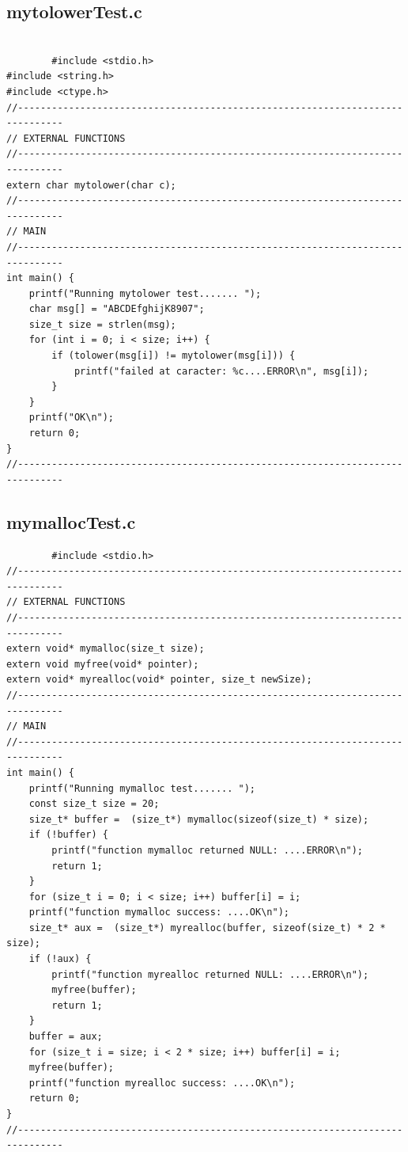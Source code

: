 \documentclass[a4paper,10pt]{article}
\begin{document}
    \subsection{mytolowerTest.c}
        \begin{lstlisting}
        
        #include <stdio.h>
#include <string.h>
#include <ctype.h>
//------------------------------------------------------------------------------
// EXTERNAL FUNCTIONS
//------------------------------------------------------------------------------
extern char mytolower(char c);
//------------------------------------------------------------------------------
// MAIN
//------------------------------------------------------------------------------
int main() {
    printf("Running mytolower test....... ");
    char msg[] = "ABCDEfghijK8907";
    size_t size = strlen(msg);
    for (int i = 0; i < size; i++) {
        if (tolower(msg[i]) != mytolower(msg[i])) {
            printf("failed at caracter: %c....ERROR\n", msg[i]);
        }
    }
    printf("OK\n");
    return 0;
}
//------------------------------------------------------------------------------
        \end{lstlisting}
        
        
    \subsection{mymallocTest.c}
        \begin{lstlisting}
        #include <stdio.h>
//------------------------------------------------------------------------------
// EXTERNAL FUNCTIONS
//------------------------------------------------------------------------------
extern void* mymalloc(size_t size);
extern void myfree(void* pointer);
extern void* myrealloc(void* pointer, size_t newSize);
//------------------------------------------------------------------------------
// MAIN
//------------------------------------------------------------------------------
int main() {
    printf("Running mymalloc test....... ");
    const size_t size = 20;
    size_t* buffer =  (size_t*) mymalloc(sizeof(size_t) * size);
    if (!buffer) {
        printf("function mymalloc returned NULL: ....ERROR\n");
        return 1;
    }
    for (size_t i = 0; i < size; i++) buffer[i] = i;
    printf("function mymalloc success: ....OK\n");
    size_t* aux =  (size_t*) myrealloc(buffer, sizeof(size_t) * 2 * size);
    if (!aux) {
        printf("function myrealloc returned NULL: ....ERROR\n");
        myfree(buffer);
        return 1;
    }
    buffer = aux;
    for (size_t i = size; i < 2 * size; i++) buffer[i] = i;
    myfree(buffer);
    printf("function myrealloc success: ....OK\n");
    return 0;
}
//------------------------------------------------------------------------------
        \end{lstlisting}
        
\end{document}
